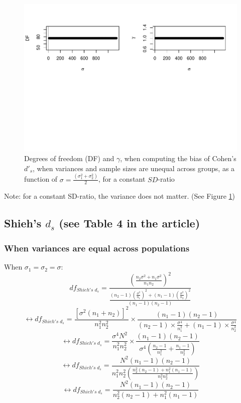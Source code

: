 \documentclass[
  man]{apa6}
\begin{document}
\begin{figure}
\centering
\includegraphics{Theoretical-Bias-of-all-estimators-as-a-function-of-population-parameters_files/figure-latex/biascohendprimehetunbalvariance2-1.pdf}
\caption{\label{fig:biascohendprimehetunbalvariance2}Degrees of freedom (DF) and \(\gamma\), when computing the bias of Cohen's \(d'_s\), when variances and sample sizes are unequal across groups, as a function of \(\sigma= \frac{(\sigma_1^2+\sigma_2^2)}{2}\), for a constant \(SD\)-ratio}
\end{figure}

Note: for a constant SD-ratio, the variance does not matter. (See Figure \ref{fig:biascohendprimehetunbalvariance2})

\hypertarget{shiehs-d_s-see-table-4-in-the-article}{%
\subsection{\texorpdfstring{Shieh's \(d_s\) (see Table 4 in the article)}{Shieh's d\_s (see Table 4 in the article)}}\label{shiehs-d_s-see-table-4-in-the-article}}

\hypertarget{when-variances-are-equal-across-populations-1}{%
\subsubsection{When variances are equal across populations}\label{when-variances-are-equal-across-populations-1}}

When \(\sigma_1=\sigma_2=\sigma\):
\[df_{Shieh's \; d_s} = \frac{\left( \frac{n_2\sigma^2+n_1\sigma^2}{n_1n_2}\right)^2}{\frac{(n_2-1)\left( \frac{\sigma^2}{n_1}\right)^2+(n_1-1)\left( \frac{\sigma^2}{n_2}\right)^2}{(n_1-1)(n_2-1)}}\]
\[\leftrightarrow df_{Shieh's \; d_s} = \frac{[\sigma^2(n_1+n_2)]^2}{n_1^2n_2^2} \times \frac{(n_1-1)(n_2-1)}{(n_2-1) \times  \frac{\sigma^4}{n_1^2}+(n_1-1) \times \frac{\sigma^4}{n_2^2}}\]
\[\leftrightarrow df_{Shieh's \; d_s} = \frac{\sigma^4N^2}{n_1^2n_2^2} \times \frac{(n_1-1)(n_2-1)}{\sigma^4 \left( \frac{n_2-1}{n^2_1}+\frac{n_1-1}{n^2_2}\right) }\]
\[\leftrightarrow df_{Shieh's \; d_s} = \frac{N^2(n_1-1)(n_2-1)}{n_1^2n_2^2 \left( \frac{n_2^2(n_2-1)+n_1^2(n_1-1)}{n_1^2n_2^2}\right)}\]
\[\leftrightarrow df_{Shieh's \; d_s} = \frac{N^2(n_1-1)(n_2-1)}{n_2^2(n_2-1)+n_1^2(n_1-1)}\]
\end{document}
